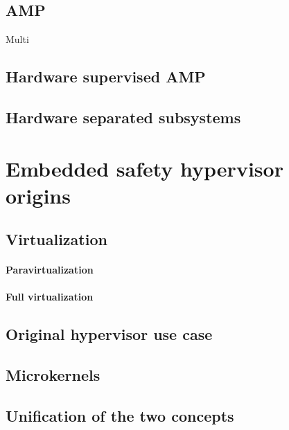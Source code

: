 \subsection{AMP}
Multi
\subsection{Hardware supervised AMP}
\subsection{Hardware separated subsystems}


\section{Embedded safety hypervisor origins}
\subsection{Virtualization}
\paragraph{Paravirtualization}
\paragraph{Full virtualization}
\subsection{Original hypervisor use case}
\subsection{Microkernels}
\subsection{Unification of the two concepts}


